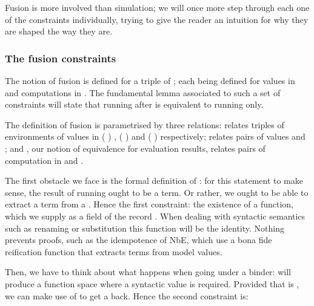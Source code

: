 Fusion is more involved than simulation; we will once more step through
each one of the constraints individually, trying to give the reader an intuition
for why they are shaped the way they are.

\subsubsection{The fusion constraints}

The notion of fusion is defined for a triple of ; each 
being defined for values in  and computations in . The
fundamental lemma associated to such a set of constraints will state that
running  after  is equivalent to running  only.

The definition of fusion is parametrised by three relations:  relates
triples of environments of values in {( )  },
{( )  } and {( )  }
respectively;  relates pairs of values  and ;
and , our notion of equivalence for evaluation results, relates pairs
of computation in  and .

\begin{agdasnippet}
\end{agdasnippet}
The first obstacle we face is the formal definition of : for this statement to make sense, the result of running
 ought to be a term. Or rather, we ought to be able to extract a
term from a . Hence the first constraint: the existence of a 
function, which we supply as a field of the record . When dealing with
syntactic semantics such as renaming or substitution
this function will be the identity. Nothing prevents proofs, such as the
idempotence of NbE, which use a bona fide reification function that extracts
terms from model values.

\begin{agdasnippet}
\addtolength{\leftskip}{\parindent}
\end{agdasnippet}
Then, we have to think about what happens when going under a binder: 
will produce a  function space where a syntactic
value is required. Provided that  is , we can make use of 
to get a  back. Hence the second constraint is:

